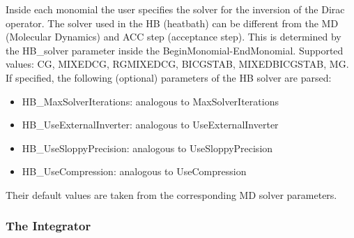 Inside each monomial the user specifies the solver for the inversion of the Dirac operator.
The solver used in the HB (heatbath) can be different from the MD (Molecular Dynamics) and ACC step (acceptance step).
%
This is determined by the {\ttfamily HB\_solver} parameter inside the {\ttfamily BeginMonomial}-{\ttfamily EndMonomial}.
Supported values: CG, MIXEDCG, RGMIXEDCG, BICGSTAB, MIXEDBICGSTAB, MG.
If specified, the following (optional) parameters of the HB solver are parsed:
\begin{itemize}
    \item {\ttfamily HB\_MaxSolverIterations}: analogous to {\ttfamily MaxSolverIterations}
    \item {\ttfamily HB\_UseExternalInverter}: analogous to {\ttfamily UseExternalInverter}
    \item {\ttfamily HB\_UseSloppyPrecision}: analogous to {\ttfamily UseSloppyPrecision}
    \item {\ttfamily HB\_UseCompression}: analogous to {\ttfamily UseCompression} 
\end{itemize}
%
Their default values are taken from the corresponding MD solver parameters.

\subsubsection{The Integrator}

